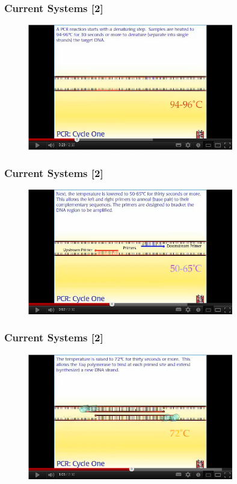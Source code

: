 \begin{frame}
\frametitle{Current Systems [2]}
\begin{figure}
  \begin{center}
    \includegraphics[width=0.8\textwidth]{./img/currentSystems2-1.png}
  \end{center}
\end{figure}
\end{frame}

\begin{frame}
\frametitle{Current Systems [2]}
\begin{figure}
  \begin{center}
    \includegraphics[width=0.8\textwidth]{./img/currentSystems2-2.png}
  \end{center}
\end{figure}
\end{frame}

\begin{frame}
\frametitle{Current Systems [2]}
\begin{figure}
  \begin{center}
    \includegraphics[width=0.8\textwidth]{./img/currentSystems2-3.png}
  \end{center}
\end{figure}
\end{frame}

